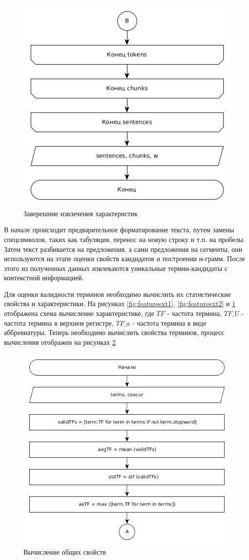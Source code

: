 \begin{figure}[!h]
	\centering
	\includegraphics[width=0.7\linewidth]{src/img/design/feature_ext_3}
	\caption{Заверешние извлечения характеристик}
	\label{fig:featureext3}
\end{figure}
В начале происходит предварительное форматирование текста, путем замены спецсимволов, таких как табуляция, перенос на новую строку и т.п. на пробелы.
Затем текст разбивается на предложения, а сами предложения на сегменты, они используются на этапе оценки свойств кандидатов и построении н-грамм. 
После этого из полученных данных извлекаются уникальные термин-кандидаты с контекстной информацией.

Для оценки валидности терминов необходимо вычислить их статистические свойства и характеристики.
На рисунках \ref{fig:featureext1}, \ref{fig:featureext2} и \ref{fig:featureext3} отображена схема вычисление характеристике, где $TF$ - частота термина, $TF\_U$ - частота термина в верхнем регистре, $TF\_a$ - частота термина в виде аббревиатуры.
Теперь необходимо вычислить свойства терминов, процесс вычисления отображен на рисунках \ref{fig:calculate1}
\begin{figure}[!h]
	\centering
	\includegraphics[width=0.7\linewidth]{src/img/design/calculate_1}
	\caption{Вычисление общих свойств}
	\label{fig:calculate1}
\end{figure}

